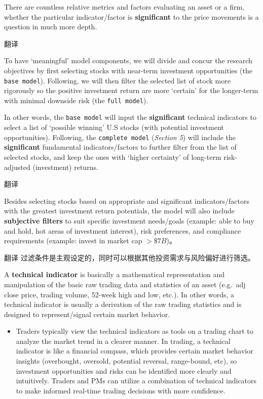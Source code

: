 \documentclass[
]{book}
\providecommand{\tightlist}{%
  \setlength{\itemsep}{0pt}\setlength{\parskip}{0pt}}
\begin{document}
There are countless relative metrics and factors evaluating an asset or
a firm, whether the particular indicator/factor is \textbf{significant}
to the price movements is a question in much more depth.

翻译

To have `meaningful' model components, we will divide and concur the
research objectives by first selecting stocks with near-term investment
opportunities (the \texttt{base\ model}). Following, we will then filter
the selected list of stock more rigorously so the positive investment
return are more `certain' for the longer-term with minimal downside risk
(the \texttt{full\ model}).

In other words, the \texttt{base\ model} will input the
\textbf{significant} technical indicators to select a list of `possible
winning' U.S stocks (with potential investment opportunities).
Following, the \texttt{complete\ model} (\emph{Section 5}) will include
the \textbf{significant} fundamental indicators/factors to further
filter from the list of selected stocks, and keep the ones with `higher
certainty' of long-term risk-adjusted (investment) returns.

翻译

Besides selecting stocks based on appropriate and significant
indicators/factors with the greatest investment return potentials, the
model will also include \textbf{subjective filters} to suit specific
investment needs/goals (example: able to buy and hold, hot areas of
investment interest), risk preferences, and compliance requirements
(example: invest in market cap \(>\$7B\))。

翻译 过滤条件是主观设定的，同时可以根据其他投资需求与风险偏好进行筛选。

A \textbf{technical indicator} is basically a mathematical
representation and manipulation of the basic raw trading data and
statistics of an asset (e.g.~adj close price, trading volume, 52-week
high and low, etc.). In other words, a technical indicator is usually a
derivation of the raw trading statistics and is designed to
represent/signal certain market behavior.

\begin{itemize}
\tightlist
\item
  Traders typically view the technical indicators as tools on a trading
  chart to analyze the market trend in a clearer manner. In trading, a
  technical indicator is like a financial compass, which provides
  certain market behavior insights (overbought, oversold, potential
  reversal, range-bound, etc), so investment opportunities and risks can
  be identified more clearly and intuitively. Traders and PMs can
  utilize a combination of technical indicators to make informed
  real-time trading decisions with more confidence.
\end{itemize}
\end{document}
